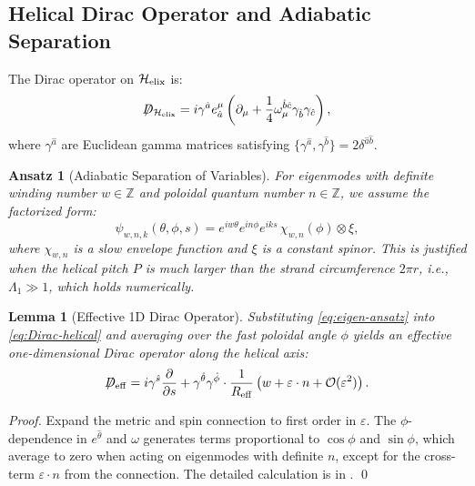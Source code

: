 \documentclass[12pt, a4paper]{article}
\newtheorem{lemma}[theorem]{Lemma}
\newtheorem{ansatz}[theorem]{Ansatz}
\theoremstyle{definition}
\newcommand{\cO}{\mathcal{O}}
\newcommand{\bbZ}{\mathbb{Z}}
\newcommand{\pd}[2]{\frac{\partial #1}{\partial #2}}
\newcommand{\notD}{\not\!\!D}
\newcommand{\eps}{\varepsilon}
\newcommand{\Hel}{\mathcal{H}_{\rm elix}}
\begin{document}
\subsection{Helical Dirac Operator and Adiabatic Separation}
The Dirac operator on $\Hel$ is:
\begin{equation}
\notD_{\Hel} = i\gamma^{\hat a} e_{\hat a}^\mu \left( \partial_\mu + \frac{1}{4} \omega_{\mu}^{\hat b\hat c} \gamma_{\hat b}\gamma_{\hat c} \right),
\label{eq:Dirac-helical}
\end{equation}
where $\gamma^{\hat a}$ are Euclidean gamma matrices satisfying $\{\gamma^{\hat a}, \gamma^{\hat b}\} = 2\delta^{\hat a\hat b}$.

\begin{ansatz}[Adiabatic Separation of Variables]
For eigenmodes with definite winding number $w \in \bbZ$ and poloidal quantum number $n \in \bbZ$, we assume the factorized form:
\begin{equation}
\psi_{w,n,k}(\theta,\phi,s) = e^{i w \theta} e^{i n \phi} e^{i k s} \, \chi_{w,n}(\phi) \otimes \xi,
\label{eq:eigen-ansatz}
\end{equation}
where $\chi_{w,n}$ is a slow envelope function and $\xi$ is a constant spinor. This is justified when the helical pitch $P$ is much larger than the strand circumference $2\pi r$, i.e., $\Lambda_1 \gg 1$, which holds numerically.
\end{ansatz}

\begin{lemma}[Effective 1D Dirac Operator]
Substituting \eqref{eq:eigen-ansatz} into \eqref{eq:Dirac-helical} and averaging over the fast poloidal angle $\phi$ yields an effective one-dimensional Dirac operator along the helical axis:
\begin{equation}
\notD_{\rm eff} = i\gamma^{\hat s} \pd{}{s} + \gamma^{\hat\theta}\gamma^{\hat\phi} \cdot \frac{1}{R_{\rm eff}} \left(w + \eps \cdot n + \cO(\eps^2)\right).
\label{eq:Dirac-effective}
\end{equation}
\end{lemma}

\begin{proof}
Expand the metric and spin connection to first order in $\eps$. The $\phi$-dependence in $e^{\hat\theta}$ and $\omega$ generates terms proportional to $\cos\phi$ and $\sin\phi$, which average to zero when acting on eigenmodes with definite $n$, except for the cross-term $\eps \cdot n$ from the connection. The detailed calculation is in . \qed
\end{proof}
\end{document}
